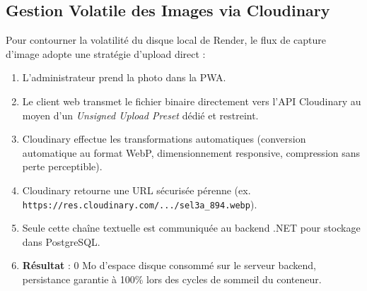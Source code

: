 \documentclass[11pt,a4paper]{article}
\begin{document}
\subsection{Gestion Volatile des Images via Cloudinary}
Pour contourner la volatilité du disque local de Render, le flux de capture d'image adopte une stratégie d'upload direct :
\begin{enumerate}[leftmargin=*]
    \item L'administrateur prend la photo dans la PWA.
    \item Le client web transmet le fichier binaire directement vers l'API Cloudinary au moyen d'un \textit{Unsigned Upload Preset} dédié et restreint.
    \item Cloudinary effectue les transformations automatiques (conversion automatique au format WebP, dimensionnement responsive, compression sans perte perceptible).
    \item Cloudinary retourne une URL sécurisée pérenne (ex. \texttt{https://res.cloudinary.com/.../sel3a\_894.webp}).
    \item Seule cette chaîne textuelle est communiquée au backend .NET pour stockage dans PostgreSQL.
    \item \textbf{Résultat} : 0 Mo d'espace disque consommé sur le serveur backend, persistance garantie à 100\% lors des cycles de sommeil du conteneur.
\end{enumerate}
\end{document}
